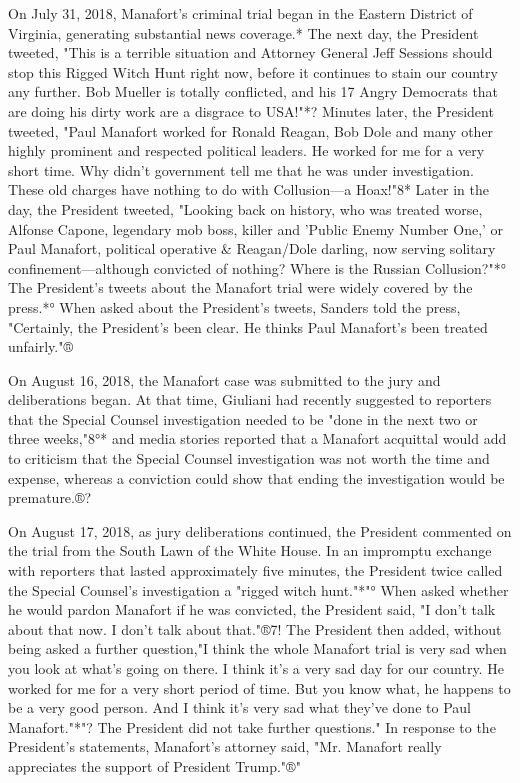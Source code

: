 On July 31, 2018, Manafort's criminal trial began in the Eastern District of Virginia, generating substantial news coverage.*
The next day, the President tweeted, "This is a terrible situation and Attorney General Jeff Sessions should stop this Rigged Witch Hunt right now, before it continues to stain our country any further.
Bob Mueller is totally conflicted, and his 17 Angry Democrats that are doing his dirty work are a disgrace to USA!"*?
Minutes later, the President tweeted, "Paul Manafort worked for Ronald Reagan, Bob Dole and many other highly prominent and respected political leaders.
He worked for me for a very short time.
Why didn't government tell me that he was under investigation.
These old charges have nothing to do with Collusion—a Hoax!"8*
Later in the day, the President tweeted, "Looking back on history, who was treated worse, Alfonse Capone, legendary mob boss, killer and 'Public Enemy Number One,' or Paul Manafort, political operative \& Reagan/Dole darling, now serving solitary confinement—although convicted of nothing?
Where is the Russian Collusion?"*°
The President's tweets about the Manafort trial were widely covered by the press.*°
When asked about the President's tweets, Sanders told the press, "Certainly, the President's been clear.
He thinks Paul Manafort's been treated unfairly."®%

On August 16, 2018, the Manafort case was submitted to the jury and deliberations began.
At that time, Giuliani had recently suggested to reporters that the Special Counsel investigation needed to be "done in the next two or three weeks,"8°*
and media stories reported that a Manafort acquittal would add to criticism that the Special Counsel investigation was not worth the time and expense, whereas a conviction could show that ending the investigation would be premature.®?

On August 17, 2018, as jury deliberations continued, the President commented on the trial from the South Lawn of the White House.
In an impromptu exchange with reporters that lasted approximately five minutes, the President twice called the Special Counsel's investigation a "rigged witch hunt."*"°
When asked whether he would pardon Manafort if he was convicted, the President said, "I don't talk about that now.
I don't talk about that."®7!
The President then added, without being asked a further question,"I think the whole Manafort trial is very sad when you look at what's going on there.
I think it's a very sad day for our country.
He worked for me for a very short period of time.
But you know what, he happens to be a very good person.
And I think it's very sad what they've done to Paul Manafort."*"?
The President did not take further questions."
In response to the President's statements, Manafort's attorney said, "Mr. Manafort really appreciates the support of President Trump."®"

